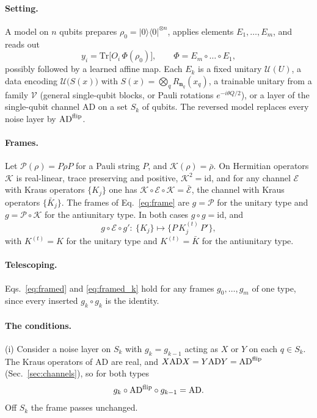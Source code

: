 \documentclass[
 aps,pra,
 twocolumn,
 superscriptaddress,
 longbibliography,
 nofootinbib
]{revtex4-2}
\newcommand{\Tr}{\mathrm{Tr}}
\providecommand{\ket}[1]{\lvert #1 \rangle}
\providecommand{\bra}[1]{\langle #1 \rvert}
\newcommand{\AD}{\mathrm{AD}}
\begin{document}
\paragraph{Setting.}
A model on $n$ qubits prepares $\rho_0=\ket{0}\bra{0}^{\otimes n}$, applies elements
$E_1,\dots,E_m$, and reads out
\begin{equation}
y_i=\Tr\bigl[O_i\,\Phi(\rho_0)\bigr],\qquad \Phi=E_m\circ\dots\circ E_1 ,
\label{eq:app_model}
\end{equation}
possibly followed by a learned affine map. Each $E_k$ is a fixed unitary $\mathcal U(U)$, a data encoding
$\mathcal U\bigl(S(x)\bigr)$ with $S(x)=\bigotimes_q R_{\mathbf n_q}(x_q)$, a trainable unitary from a
family $\mathcal V$ (general single-qubit blocks, or Pauli rotations $e^{-i\theta Q/2}$), or a
layer of the single-qubit channel $\AD$ on a set $S_k$ of qubits. The reversed model
replaces every noise layer by $\AD^{\rm flip}$.

\paragraph{Frames.}
Let $\mathcal P(\rho)=P\rho P$ for a Pauli string $P$, and $\mathcal K(\rho)=\bar\rho$. On Hermitian
operators $\mathcal K$ is real-linear, trace preserving and positive, $\mathcal K^2=\mathrm{id}$,
and for any channel $\mathcal E$ with Kraus operators $\{K_j\}$ one has
$\mathcal K\circ\mathcal E\circ\mathcal K=\bar{\mathcal E}$, the channel with Kraus operators
$\{\bar K_j\}$. The frames of Eq.~\eqref{eq:frame} are $g=\mathcal P$ for the unitary type and
$g=\mathcal P\circ\mathcal K$ for the antiunitary type. In both cases $g\circ g=\mathrm{id}$, and
\begin{equation}
g\circ\mathcal E\circ g'\colon\ \{K_j\}\mapsto\bigl\{P\,K_j^{(t)}\,P'\bigr\},
\label{eq:app_frame}
\end{equation}
with $K^{(t)}=K$ for the unitary type and $K^{(t)}=\bar K$ for the antiunitary type.

\paragraph{Telescoping.}
Eqs.~\eqref{eq:framed} and \eqref{eq:framed_k} hold for any frames
$g_0,\dots,g_m$ of one type, since every inserted $g_k\circ g_k$ is the identity.

\paragraph{The conditions.}
(i) Consider a noise layer on $S_k$ with $g_k=g_{k-1}$ acting as $X$ or $Y$ on each
$q\in S_k$. The Kraus operators of $\AD$ are real, and
$X\AD X=Y\AD Y=\AD^{\rm flip}$ (Sec.~\ref{sec:channels}), so for both types
\begin{equation}
g_k\circ\AD^{\rm flip}\circ g_{k-1}=\AD .
\label{eq:app_i}
\end{equation}
Off $S_k$ the frame passes unchanged.
\end{document}
